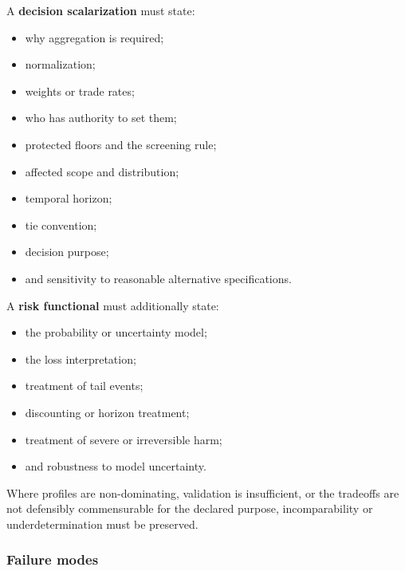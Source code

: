 \documentclass[
  11pt,
]{article}
\providecommand{\tightlist}{%
  \setlength{\itemsep}{0pt}\setlength{\parskip}{0pt}}
\begin{document}
A \textbf{decision scalarization} must state:

\begin{itemize}
\tightlist
\item
  why aggregation is required;
\item
  normalization;
\item
  weights or trade rates;
\item
  who has authority to set them;
\item
  protected floors and the screening rule;
\item
  affected scope and distribution;
\item
  temporal horizon;
\item
  tie convention;
\item
  decision purpose;
\item
  and sensitivity to reasonable alternative specifications.
\end{itemize}

A \textbf{risk functional} must additionally state:

\begin{itemize}
\tightlist
\item
  the probability or uncertainty model;
\item
  the loss interpretation;
\item
  treatment of tail events;
\item
  discounting or horizon treatment;
\item
  treatment of severe or irreversible harm;
\item
  and robustness to model uncertainty.
\end{itemize}

Where profiles are non-dominating, validation is insufficient, or the
tradeoffs are not defensibly commensurable for the declared purpose,
incomparability or underdetermination must be preserved.

\subsubsection{Failure modes}\label{failure-modes-1}
\end{document}
